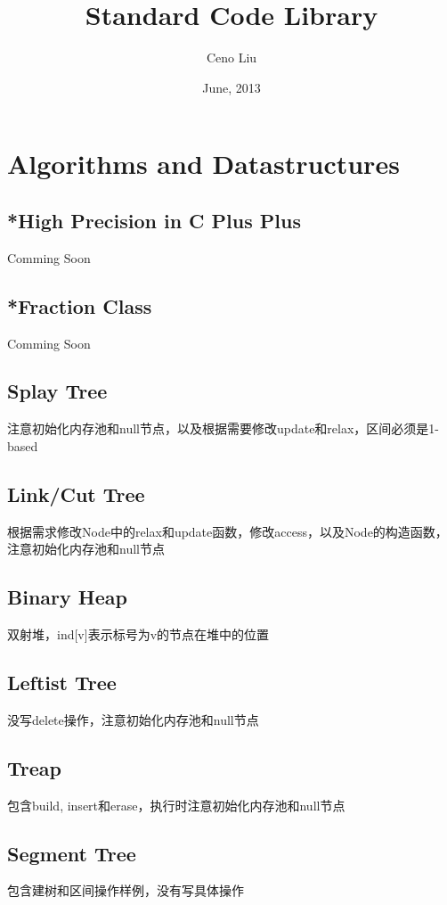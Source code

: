 \documentclass[a4paper,10pt]{report}
\title{\LARGE{Standard Code Library}}
\author{Ceno Liu}
\date{June, 2013}
\begin{document}
\maketitle

\tableofcontents

\chapter{Algorithms and Datastructures}

	\section{*High Precision in C Plus Plus}
	Comming Soon

	\section{*Fraction Class}
	Comming Soon

	\section{Splay Tree}
	注意初始化内存池和null节点，以及根据需要修改update和relax，区间必须是1-based
	

	\section{Link/Cut Tree}
	根据需求修改Node中的relax和update函数，修改access，以及Node的构造函数，注意初始化内存池和null节点
	

	\section{Binary Heap}
	双射堆，ind[v]表示标号为v的节点在堆中的位置
	

	\section{Leftist Tree}
	没写delete操作，注意初始化内存池和null节点
	

	\section{Treap}
	包含build, insert和erase，执行时注意初始化内存池和null节点
	

	\section{Segment Tree}
	包含建树和区间操作样例，没有写具体操作
	
\end{document}

